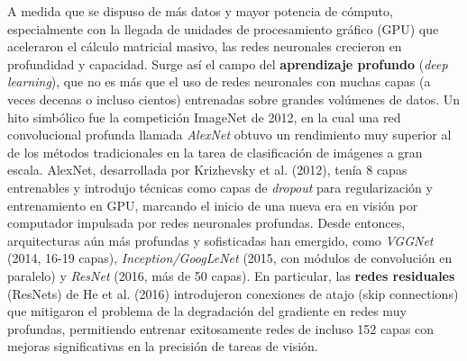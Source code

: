 \documentclass[11pt,spanish,listoffigures,listoftables]{tfgetsinf}
\begin{document}
A medida que se dispuso de más datos y mayor potencia de cómputo, especialmente con la llegada de unidades de procesamiento gráfico (GPU) que aceleraron el cálculo 
matricial masivo, las redes neuronales crecieron en profundidad y capacidad. Surge así el campo del \textbf{aprendizaje profundo} (\textit{deep learning}), que no es 
más que el uso de redes neuronales con muchas capas (a veces decenas o incluso cientos) entrenadas sobre grandes volúmenes de datos. Un hito simbólico fue la competición 
ImageNet de 2012, en la cual una red convolucional profunda llamada \textit{AlexNet} \cite{Krizhevsky2012} obtuvo un rendimiento muy superior al de los métodos tradicionales en la tarea de 
clasificación de imágenes a gran escala. AlexNet, desarrollada por Krizhevsky et al. (2012), tenía 8 capas entrenables y introdujo técnicas como capas de \textit{dropout} 
para regularización y entrenamiento en GPU, marcando el inicio de una nueva era en visión por computador impulsada por redes neuronales profundas. Desde entonces, 
arquitecturas aún más profundas y sofisticadas han emergido, como \textit{VGGNet} (2014, 16-19 capas), \textit{Inception/GoogLeNet} (2015, con módulos de convolución 
en paralelo) y \textit{ResNet} \cite{He2016} (2016, más de 50 capas). En particular, las \textbf{redes residuales} (ResNets) de He et al. (2016) introdujeron conexiones de atajo 
(skip connections) que mitigaron el problema de la degradación del gradiente en redes muy profundas, permitiendo entrenar exitosamente redes de incluso 152 capas con 
mejoras significativas en la precisión de tareas de visión.
\end{document}
